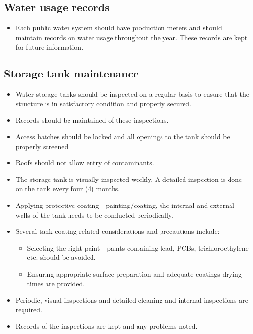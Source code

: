 \subsection{Water usage records} 
\begin{itemize}
\item Each public water system should have production meters and should maintain records on water usage throughout the year. These records are kept for future information.
\end{itemize}

\subsection{Storage tank maintenance} 
\begin{itemize}
\item Water storage tanks should be inspected on a regular basis to ensure that the structure is in satisfactory condition and properly secured. 
\item Records should be maintained of these inspections.  
\item Access hatches should be locked and all openings to the tank should be properly screened.  
\item Roofs should not allow entry of contaminants.
\item The storage tank is visually inspected weekly.  A detailed inspection is done on the tank every four (4) months.  
\item Applying protective coating - painting/coating, the internal and external walls of the tank needs to be conducted periodically.
\item Several tank coating related considerations and precautions include: 
\begin{itemize}
\item Selecting the right paint - paints containing lead, PCBs, trichloroethylene etc. should be avoided.
\item  Ensuring appropriate surface preparation and adequate coatings drying times are provided.
\end{itemize}
\item Periodic, visual inspections and detailed cleaning and internal inspections are required. 

\item Records of the inspections are kept and any problems noted.
\end{itemize}

